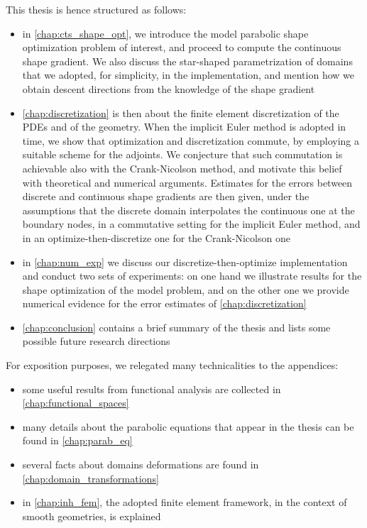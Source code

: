 \documentclass[english,a4paper,9pt,oneside]{scrbook}	%
\theoremstyle{break}
\theoremstyle{remark}
\begin{document}
This thesis is hence structured as follows:

\begin{itemize}
	\item in \cref{chap:cts_shape_opt}, we introduce the model parabolic shape optimization problem of interest, and proceed to compute the continuous shape gradient. We also discuss the star-shaped parametrization of domains that we adopted, for simplicity, in the implementation, and mention how we obtain descent directions from the knowledge of the shape gradient
	\item \cref{chap:discretization} is then about the finite element discretization of the PDEs and of the geometry. When the implicit Euler method is adopted in time, we show that optimization and discretization commute, by employing a suitable scheme for the adjoints. We conjecture that such commutation is achievable also with the Crank-Nicolson method, and motivate this belief with theoretical and numerical arguments. Estimates for the errors between discrete and continuous shape gradients are then given, under the assumptions that the discrete domain interpolates the continuous one at the boundary nodes, in a commutative setting for the implicit Euler method, and in an optimize-then-discretize one for the Crank-Nicolson one 
	\item in \cref{chap:num_exp} we discuss our discretize-then-optimize implementation and conduct two sets of experiments: on one hand we illustrate results for the shape optimization of the model problem, and on the other one we provide numerical evidence for the error estimates of \cref{chap:discretization}
	\item \cref{chap:conclusion} contains a brief summary of the thesis and lists some possible future research directions
\end{itemize}

For exposition purposes, we relegated many technicalities to the appendices:

\begin{itemize}
	\item some useful results from functional analysis are collected in \cref{chap:functional_spaces}
	\item many details about the parabolic equations that appear in the thesis can be found in \cref{chap:parab_eq}
	\item several facts about domains deformations are found in \cref{chap:domain_transformations}
	\item in \cref{chap:inh_fem}, the adopted finite element framework, in the context of smooth geometries, is explained
\end{itemize}
\end{document}
